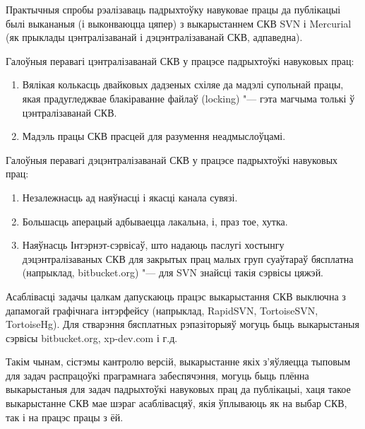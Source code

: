 \documentclass[10pt, a5paper]{article}
\begin{document}
Практычныя спробы рэалізаваць падрыхтоўку навуковае працы да публікацыі былі выкананыя (і выконваюцца цяпер) з выкарыстаннем СКВ SVN і Mercurial (як прыклады цэнтралізаванай і дэцэнтралізаванай СКВ, адпаведна).

Галоўныя перавагі цэнтралізаванай СКВ у працэсе падрыхтоўкі навуковых прац:

\begin{enumerate}
  \item Вялікая колькасць двайковых дадзеных схіляе да мадэлі супольнай працы, якая прадугледжвае блакіраванне файлаў \linebreak (locking) "--- гэта магчыма толькі ў цэнтралізаванай СКВ.
  \item Мадэль працы СКВ прасцей для разумення неадмыслоўцамі.
\end{enumerate}

Галоўныя перавагі дэцэнтралізаванай СКВ у працэсе падрыхтоўкі навуковых прац:

\begin{enumerate}
  \item Незалежнасць ад наяўнасці і якасці канала сувязі.
  \item Большасць аперацый адбываецца лакальна, і, праз тое, хутка.
  \item Наяўнасць Інтэрнэт-сэрвісаў, што надаюць паслугі хостынгу дэцэнтралізаваных СКВ для закрытых прац малых груп суаўтараў бясплатна (напрыклад, bitbucket.org) "--- для SVN знайсці такія сэрвісы цяжэй.
\end{enumerate}

Асаблівасці задачы цалкам дапускаюць працэс выкарыстання СКВ выключна з дапамогай графічнага інтэрфейсу (напрыклад, RapidSVN, TortoiseSVN, TortoiseHg). Для стварэння бясплатных рэпазіторыяў могуць быць выкарыстаныя сэрвісы bitbucket.org, xp-dev.com і г.д.

Такім чынам, сістэмы кантролю версій, выкарыстанне якіх з'яўляецца тыповым для задач распрацоўкі праграмнага забеспячэння, могуць быць плённа выкарыстаныя для задач падрыхтоўкі навуковых прац да публікацыі, хаця такое выкарыстанне СКВ мае шэраг асаблівасцяў, якія ўплываюць як на выбар СКВ, так і на працэс працы з ёй.
\end{document}

